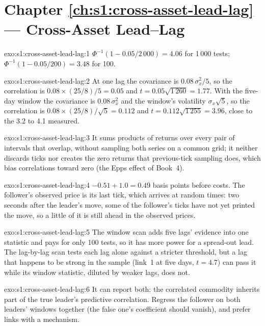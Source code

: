 \section*{Chapter \ref{ch:s1:cross-asset-lead-lag} --- Cross-Asset Lead--Lag}

\begin{solution}{exo:s1:cross-asset-lead-lag:1}
$\Phi^{-1}(1 - 0.05/2\,000) = 4.06$ for 1\,000 tests; $\Phi^{-1}(1 - 0.05/200) = 3.48$ for 100.
\end{solution}

\begin{solution}{exo:s1:cross-asset-lead-lag:2}
At one lag the covariance is $0.08\,\sigma_x^2/5$, so the correlation is $0.08 \times (25/8)/5 = 0.05$ and $t = 0.05\sqrt{1\,260} = 1.77$. With the
five-day window the covariance is $0.08\,\sigma_x^2$ and the window's volatility $\sigma_x\sqrt5$, so the correlation is $0.08 \times (25/8)/\sqrt5 = 0.112$
and $t = 0.112\sqrt{1\,255} = 3.96$, close to the 3.2 to 4.1 measured.
\end{solution}

\begin{solution}{exo:s1:cross-asset-lead-lag:3}
It sums products of returns over every pair of intervals that overlap, without sampling both series on a common grid; it neither discards ticks nor
creates the zero returns that previous-tick sampling does, which bias correlations toward zero (the Epps effect of Book~4).
\end{solution}

\begin{solution}{exo:s1:cross-asset-lead-lag:4}
$-0.51 + 1.0 = 0.49$ basis points before costs. The follower's observed price is its last tick, which arrives at random times: two seconds after the
leader's move, some of the follower's ticks have not yet printed the move, so a little of it is still ahead in the observed prices.
\end{solution}

\begin{solution}{exo:s1:cross-asset-lead-lag:5}
The window scan adds five lags' evidence into one statistic and pays for only 100 tests, so it has more power for a spread-out lead. The lag-by-lag
scan tests each lag alone against a stricter threshold, but a lag that happens to be strong in the sample (link~1 at five days, $t = 4.7$) can pass it
while its window statistic, diluted by weaker lags, does not.
\end{solution}

\begin{solution}{exo:s1:cross-asset-lead-lag:6}
It can report both: the correlated commodity inherits part of the true leader's predictive correlation. Regress the follower on both leaders' windows
together (the false one's coefficient should vanish), and prefer links with a mechanism.
\end{solution}

